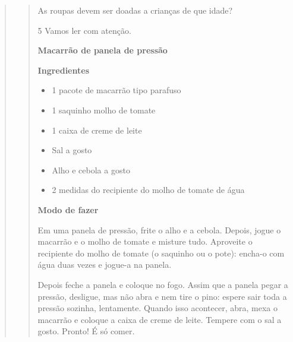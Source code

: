 \begin{escolha}
\begin{escolha}
\begin{verse}
\begin{verse}
\begin{escolha}

\item As roupas devem ser doadas a crianças de que idade?

\end{escolha}

\num{5} Vamos ler com atenção.



\textbf{Macarrão de panela de pressão}

\textbf{Ingredientes}


\begin{itemize}
\item 1 pacote de macarrão tipo parafuso

\item 1 saquinho molho de tomate

\item 1 caixa de creme de leite

\item Sal a gosto

\item Alho e cebola a gosto

\item 2 medidas do recipiente do molho de tomate de água

\end{itemize}

\textbf{Modo de fazer}

Em uma panela de pressão, frite o alho e a cebola. Depois, jogue o
macarrão e o molho de tomate e misture tudo. Aproveite o recipiente
do molho de tomate (o saquinho ou o pote): encha-o com água duas vezes
e jogue-a na panela.

Depois feche a panela e coloque no fogo. Assim que a panela pegar a
pressão, desligue, mas não abra e nem tire o pino: espere sair toda 
a pressão sozinha, lentamente. Quando isso acontecer, abra, mexa o
macarrão e coloque a caixa de creme de leite. Tempere com o sal a gosto.
Pronto! É só comer. 


\end{verse}
\end{verse}
\end{escolha}
\end{escolha}
